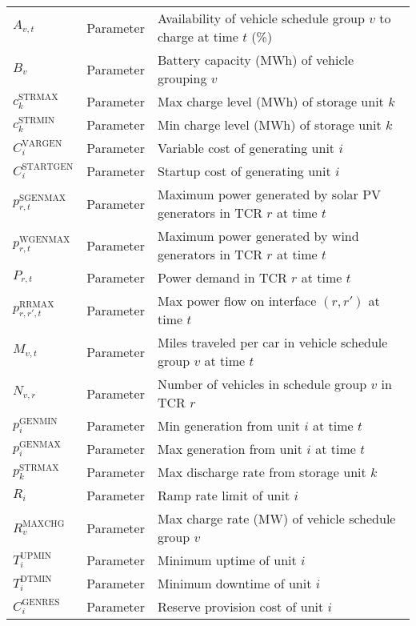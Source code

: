 \documentclass[9pt,twoside,lineno]{pnas-new}
\begin{document}
\begin{table}[!ht]
\begin{center}
\begin{tabular}{lll}
      \hline
      $A_{v,t}$ & Parameter & Availability of vehicle schedule group $v$ to charge at time $t$ (\%) \\
      $B_{v}$ & Parameter & Battery capacity (MWh) of vehicle grouping $v$\\
      ${c^{\mathrm{STRMAX}}_{k}} $ & Parameter & Max charge level (MWh) of storage unit $k$ \\
      ${c^{\mathrm{STRMIN}}_{k}} $ & Parameter & Min charge level (MWh) of storage unit $k$ \\
      $C^{\mathrm{VARGEN}}_i$ & Parameter & Variable cost of generating unit $i$ \\
      $C^{\mathrm{STARTGEN}}_i$ & Parameter & Startup cost of generating unit $i$ \\
      $p^{\mathrm{SGENMAX}}_{r,t}$ & Parameter & Maximum power generated by solar PV generators in TCR $r$ at time $t$ \\
      $p^{\mathrm{WGENMAX}}_{r,t}$ & Parameter & Maximum power generated by wind generators in TCR $r$ at time $t$ \\
      $P_{r,t} $ & Parameter & Power demand in TCR $r$ at time $t$ \\
      $p^{\mathrm{RRMAX}}_{r,r',t} $ & Parameter & Max power flow on interface $(r,r')$ at time $t$ \\
      $M_{v,t}$ & Parameter & Miles traveled per car in vehicle schedule group $v$ at time $t$ \\
      $N_{v,r}$ & Parameter & Number of vehicles in schedule group $v$ in TCR $r$ \\
      ${p^{\mathrm{GENMIN}}_{i}} $ & Parameter & Min generation from unit $i$ at time $t$ \\
      ${p^{\mathrm{GENMAX}}_{i}} $ & Parameter & Max generation from unit $i$ at time $t$ \\
      $p^{\mathrm{STRMAX}}_{k} $ & Parameter & Max discharge rate from storage unit $k$ \\
      $R_{i} $ & Parameter & Ramp rate limit of unit $i$ \\
      $R^{\mathrm{MAXCHG}}_v$ & Parameter & Max charge rate (MW) of vehicle schedule group $v$\\
      $T_{i}^{\mathrm{UPMIN}} $ & Parameter & Minimum uptime of unit $i$ \\
      $T_{i}^{\mathrm{DTMIN}} $ & Parameter & Minimum downtime of unit $i$ \\
      $C^{\mathrm{GENRES}}_{i}$ & Parameter & Reserve provision cost of unit $i$\\

\end{tabular}
\end{center}
\end{table}
\end{document}
